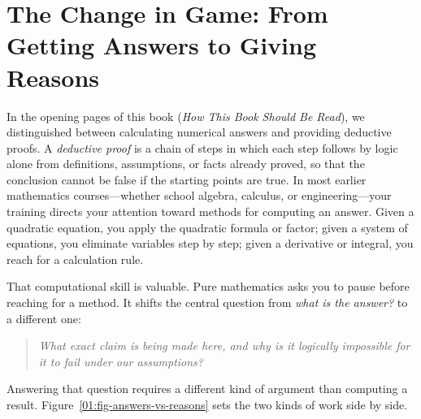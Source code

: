 \section{The Change in Game: From Getting Answers to Giving Reasons}
\chapterline

In the opening pages of this book (\emph{How This Book Should Be Read}), we distinguished between calculating numerical answers and providing deductive proofs. A \emph{deductive proof} is a chain of steps in which each step follows by logic alone from definitions, assumptions, or facts already proved, so that the conclusion cannot be false if the starting points are true. In most earlier mathematics courses---whether school algebra, calculus, or engineering---your training directs your attention toward methods for computing an answer. Given a quadratic equation, you apply the quadratic formula or factor; given a system of equations, you eliminate variables step by step; given a derivative or integral, you reach for a calculation rule.

That computational skill is valuable. Pure mathematics asks you to pause before reaching for a method. It shifts the central question from \emph{what is the answer?} to a different one:

\begin{quote}
\itshape What exact claim is being made here, and why is it logically impossible for it to fail under our assumptions?
\end{quote}

Answering that question requires a different kind of argument than computing a result. Figure~\ref{01:fig-answers-vs-reasons} sets the two kinds of work side by side.

